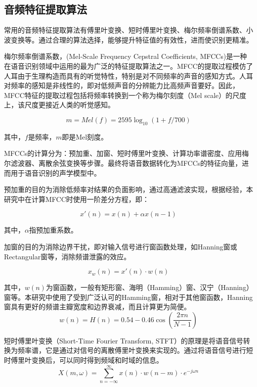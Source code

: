 \documentclass[lang=cn,cite=super]{elegantpaper}
\begin{document}
\subsection{音频特征提取算法}
常用的音频特征提取算法有傅里叶变换、短时傅里叶变换、梅尔频率倒谱系数、小波变换等。通过合理的算法选择，能够提升特征值的有效性，进而使识别更精准。

梅尔频率倒谱系数，(Mel-Scale Frequency Cepstral Coefficients, MFCCs)是一种在语音识别领域中运用的最为广泛的特征提取算法之一。MFCC的提取过程模仿了人耳由于生理构造而具有的听觉特性，特别是对不同频率的声音的感知方式。人耳对频率的感知是非线性的，即对低频声音的分辨能力比高频声音要好。因此，MFCC特征的提取过程包括将频率转换到一个称为梅尔刻度（Mel scale）的尺度上，该尺度更接近人类的听觉感知。

\begin{equation}
    m = Mel(f) = 2595 \log_{10}(1+f/700)
\end{equation}

其中，$f$是频率，$m$即是Mel刻度。

MFCCs的计算分为：预加重、加窗、短时傅里叶变换、计算功率谱密度、应用梅尔滤波器、离散余弦变换等步骤。最终将语音数据转化为MFCCs的特征向量，进而用于语音识别的声学模型中。

预加重的目的为消除低频率对结果的负面影响，通过高通滤波实现，根据经验，本研究中在计算MFCC时使用一阶差分方程，即：

\begin{equation}
    x'(n) = x(n) + \alpha x(n-1) 
\end{equation}

其中，$\alpha$指预加重系数。

加窗的目的为消除边界干扰，即对输入信号进行窗函数处理，如Hanning窗或Rectangular窗等，消除频谱泄露的效应。

\begin{equation}
    x_w(n) = x'(n) \cdot w(n)
\end{equation}

其中，$w(n)$为窗函数，一般有矩形窗、海明（Hamming）窗、汉宁（Hanning）窗等。本研究中使用了受到广泛认可的Hamming窗，相对于其他窗函数，Hanning窗具有更好的频谱主瓣宽度和边界衰减，而且计算更为简便。
\begin{equation}
    w(n) = H(n) = 0.54 - 0.46 \cos \left( \frac{2\pi n}{N-1} \right)
\end{equation}

短时傅里叶变换（Short-Time Fourier Transform, STFT）的原理是将语音信号转换为频率谱，它是通过对信号的离散傅里叶变换来实现的。通过将语音信号进行短时傅里叶变换后，可以同时得到频域和时域的信息。
\begin{equation}
    X(m, \omega) = \sum_{n=-\infty}^{\infty} x(n) \cdot w(n-m) \cdot e^{-j\omega n}
\end{equation}
\end{document}
